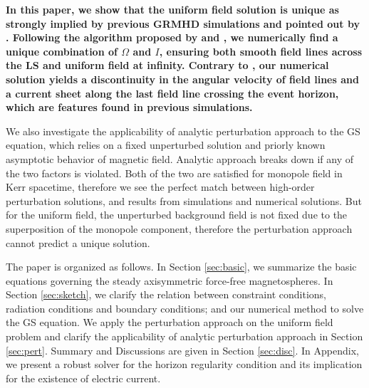 \documentclass[iop,apj]{emulateapj}
\begin{document}
{\bf In this paper, we show that the uniform field solution is
unique as strongly implied by previous GRMHD simulations
and pointed out by \citet{Nathanail2014}.
Following the algorithm proposed by \citet{Contopoulos2013} and \citet{Nathanail2014},
we numerically find a unique combination of $\Omega$ and $I$,
ensuring both smooth field lines across the LS and uniform field at infinity.
Contrary to \citet{Nathanail2014}, our numerical solution yields a discontinuity in the angular velocity of
field lines and a current sheet along the last field line crossing the event horizon,
which are features found in previous simulations.}


We also investigate the applicability of analytic perturbation approach to the GS equation,
which relies on a fixed unperturbed solution and priorly known asymptotic behavior of magnetic field.
Analytic approach breaks down if any of the two factors is violated.
Both of the two are satisfied for monopole field in Kerr spacetime,
therefore we see the perfect match between high-order perturbation solutions,
and results from simulations and numerical solutions.
But for the uniform field, the unperturbed background field is not fixed due to
the superposition of the monopole component, therefore the perturbation approach
cannot predict a unique solution.


The paper is organized as follows. In Section \ref{sec:basic},
we summarize the basic equations governing the steady axisymmetric force-free magnetospheres.
In Section \ref{sec:sketch}, we clarify the relation between constraint conditions, radiation
conditions and boundary conditions; and our numerical method to solve the GS equation.
We apply the perturbation approach on the uniform field problem
and clarify the applicability of analytic perturbation approach in Section \ref{sec:pert}.
Summary and Discussions are given in Section \ref{sec:disc}. In Appendix, we present a robust solver
for the horizon regularity condition and its implication for the existence of electric current.
\end{document}
